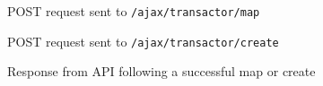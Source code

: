 \begin{appendices}
\begin{figure}
    
    \caption{POST request sent to \lstinline{/ajax/transactor/map}}
    \label{fig:json-map-example}
\end{figure}

\begin{figure}
    
    \caption{POST request sent to \lstinline{/ajax/transactor/create}}
    \label{fig:json-create-example}
\end{figure}

\begin{figure}
    
    \caption{Response from API following a successful map or create}
    \label{fig:json-response-example}
\end{figure}

\end{appendices}
